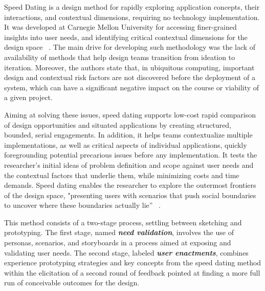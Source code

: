 \label{sec:speeddating}

Speed Dating is a design method for rapidly exploring application concepts, their interactions, and contextual dimensions, requiring no technology implementation. It was developed at Carnegie Mellon University for accessing finer-grained insights into user needs, and identifying critical contextual dimensions for the design space ~\cite{Davidoff2007}. The main drive for developing such methodology was the lack of availability of methods that help design teams transition from ideation to iteration. Moreover, the authors state that, in ubiquitous computing, important design and contextual risk factors are not discovered before the deployment of a system, which can have a significant negative impact on the course or viability of a given project.

Aiming at solving these issues, speed dating supports low-cost rapid comparison of design opportunities and situated applications by creating structured, bounded, serial engagements. In addition, it helps teams contextualize multiple implementations, as well as critical aspects of individual applications, quickly foregrounding potential precarious issues before any implementation. It tests the researcher's initial ideas of problem definition and scope against user needs and the contextual factors that underlie them, while minimizing costs and time demands. Speed dating enables the researcher to explore the outermost frontiers of the design space, "presenting users with scenarios that push social boundaries to uncover where these boundaries actually lie” ~\cite{Davidoff2007}.

This method consists of a two-stage process, settling between sketching and prototyping. The first stage, named \textbf{\textit{need validation}}, involves the use of personas, scenarios, and storyboards in a process aimed at exposing and validating user needs. The second stage, labeled \textbf{\textit{user enactments}}, combines experience prototyping strategies and key concepts from the speed dating method within the elicitation of a second round of feedback pointed at finding a more full run of conceivable outcomes for the design.

